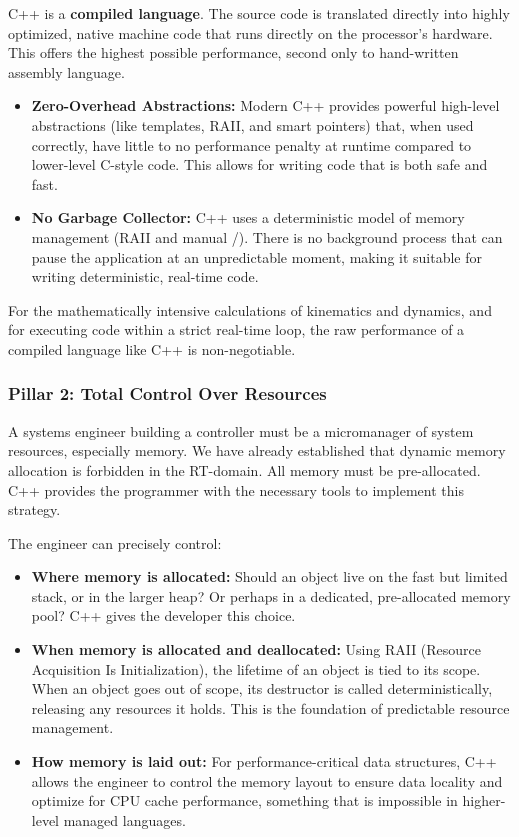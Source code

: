 C++ is a \textbf{compiled language}. The source code is translated directly into highly optimized, native machine code that runs directly on the processor's hardware. This offers the highest possible performance, second only to hand-written assembly language.
\begin{itemize}
    \item \textbf{Zero-Overhead Abstractions:} Modern C++ provides powerful high-level abstractions (like templates, RAII, and smart pointers) that, when used correctly, have little to no performance penalty at runtime compared to lower-level C-style code. This allows for writing code that is both safe and fast.
    \item \textbf{No Garbage Collector:} C++ uses a deterministic model of memory management (RAII and manual /). There is no background process that can pause the application at an unpredictable moment, making it suitable for writing deterministic, real-time code.
\end{itemize}

For the mathematically intensive calculations of kinematics and dynamics, and for executing code within a strict real-time loop, the raw performance of a compiled language like C++ is non-negotiable.

\subsubsection{Pillar 2: Total Control Over Resources}
\label{subsubsec:gpl_control}

A systems engineer building a controller must be a micromanager of system resources, especially memory. We have already established that dynamic memory allocation is forbidden in the RT-domain. All memory must be pre-allocated. C++ provides the programmer with the necessary tools to implement this strategy.

The engineer can precisely control:
\begin{itemize}
    \item \textbf{Where memory is allocated:} Should an object live on the fast but limited stack, or in the larger heap? Or perhaps in a dedicated, pre-allocated memory pool? C++ gives the developer this choice.
    \item \textbf{When memory is allocated and deallocated:} Using RAII (Resource Acquisition Is Initialization), the lifetime of an object is tied to its scope. When an object goes out of scope, its destructor is called deterministically, releasing any resources it holds. This is the foundation of predictable resource management.
    \item \textbf{How memory is laid out:} For performance-critical data structures, C++ allows the engineer to control the memory layout to ensure data locality and optimize for CPU cache performance, something that is impossible in higher-level managed languages.
\end{itemize}

